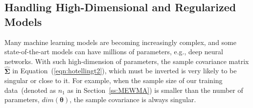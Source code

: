 \documentclass[twoside,11pt]{article}
\begin{document}



\subsection{Handling High-Dimensional and Regularized Models}
\label{ss:high_dim_score}
Many machine learning models are becoming increasingly complex, and some state-of-the-art models can have millions of parameters, e.g., deep neural networks. With such high-dimension of parameters, the sample covariance matrix $\widehat {\bm { \Sigma}}$ in Equation~(\ref{eqn:hotellingt2}), which must be inverted is very likely to be singular or close to it. For example, when the sample size of our training data~(denoted as $n_1$ as in Section~\ref{ss:MEWMA}) is smaller than the number of parameters, $dim(\bm { \theta})$, the sample covariance is always singular. 
\end{document}
